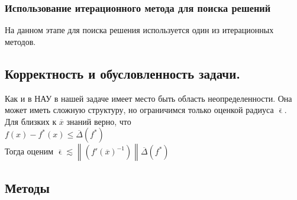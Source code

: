 \documentclass[16pt]{article}
\begin{document}
            \subsubsection{Использование итерационного метода для поиска решений}
            На данном этапе для поиска решения используется один из итерационных методов.
            \subsection{Корректность и обусловленность задачи.}
            Как и в НАУ в нашей задаче имеет место быть область неопределенности. Она может иметь сложную структуру, но ограничимся только оценкой радиуса $\overline{\upvarepsilon}$.\\
            Для близких к $\overline{x}$ знаний верно, что\\
            $f(x) - f^{*}(x) \leq \overline{\Delta}(f^{*})$\\
            Тогда оценим $\overline{\upvarepsilon} \lesssim \left\| (f'(\overline{x})^{-1})\right\|\overline{\Delta}(f^{*})$\\
            \subsection{Методы}
\end{document}
